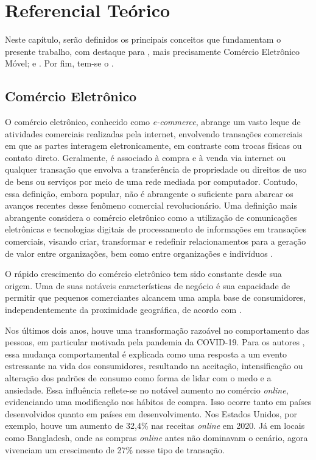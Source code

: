 \chapter{Referencial Teórico}
    \label{chap:ReferencialTeorico}

Neste capítulo, serão definidos os principais conceitos que fundamentam o presente trabalho, com destaque para , mais precisamente Comércio Eletrônico Móvel;  e . Por fim, tem-se o .


\section{Comércio Eletrônico} 
    \label{ComercioEletronico}

O comércio eletrônico, conhecido como \textit{e-commerce}, abrange um vasto leque de atividades comerciais realizadas pela internet, envolvendo transações comerciais em que as partes interagem eletronicamente, em contraste com trocas físicas ou contato direto. Geralmente, é associado à compra e à venda via internet ou qualquer transação que envolva a transferência de propriedade ou direitos de uso de bens ou serviços por meio de uma rede mediada por computador. Contudo, essa definição, embora popular, não é abrangente o suficiente para abarcar os avanços recentes desse fenômeno comercial revolucionário. Uma definição mais abrangente considera o comércio eletrônico como a utilização de comunicações eletrônicas e tecnologias digitais de processamento de informações em transações comerciais, visando criar, transformar e redefinir relacionamentos para a geração de valor entre organizações, bem como entre organizações e indivíduos .

O rápido crescimento do comércio eletrônico tem sido constante desde sua origem. Uma de suas notáveis características de negócio é sua capacidade de permitir que pequenos comerciantes alcancem uma ampla base de consumidores, independentemente da proximidade geográfica, de acordo com .

Nos últimos dois anos, houve uma transformação razoável no comportamento das pessoas, em particular motivada pela pandemia da COVID-19. Para os autores , essa mudança comportamental é explicada como uma resposta a um evento estressante na vida dos consumidores, resultando na aceitação, intensificação ou alteração dos padrões de consumo como forma de lidar com o medo e a ansiedade. Essa influência reflete-se no notável aumento no comércio \textit{online}, evidenciando uma modificação nos hábitos de compra. Isso ocorre tanto em países desenvolvidos quanto em países em desenvolvimento. Nos Estados Unidos, por exemplo, houve um aumento de 32,4\% nas receitas \textit{online} em 2020. Já em locais como Bangladesh, onde as compras \textit{online} antes não dominavam o cenário, agora vivenciam um crescimento de 27\% nesse tipo de transação.

